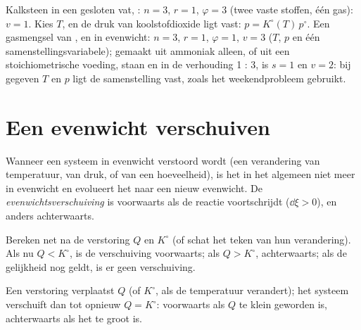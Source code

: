 \begin{example}\label{ex:b2:equilibrium-shifts:variances}
Kalksteen in een gesloten vat, : $n = 3$, $r =
1$, $\varphi = 3$ (twee vaste stoffen, één gas): $v = 1$. Kies $T$, en de druk
van koolstofdioxide ligt vast: $p = K^\circ(T)\,p^\circ$. Een gasmengsel van
,  en  in evenwicht: $n = 3$, $r = 1$, $\varphi = 1$, $v
= 3$ ($T$, $p$ en één samenstellingsvariabele); gemaakt uit ammoniak alleen, of uit
een stoichiometrische voeding, staan  en  in de verhouding 1 : 3, is $s = 1$ en
$v = 2$: bij gegeven $T$ en $p$ ligt de samenstelling vast, zoals het weekendprobleem
gebruikt.
\end{example}

\section{Een evenwicht verschuiven}

\begin{definition}\label{def:b2:equilibrium-shifts:shift}
Wanneer een systeem in evenwicht verstoord wordt (een verandering van temperatuur, van
druk, of van een hoeveelheid), is het in het algemeen niet meer in evenwicht en
evolueert het naar een nieuw evenwicht. De \emph{evenwichtsverschuiving}
is voorwaarts als de reactie voortschrijdt ($\dd\xi > 0$), en anders
achterwaarts.
\end{definition}

\begin{method}\label{met:b2:equilibrium-shifts:predict-shift}
Bereken net na de verstoring $Q$ en $K^\circ$ (of schat het teken van hun verandering).
Als nu $Q < K^\circ$, is de verschuiving voorwaarts; als $Q > K^\circ$,
achterwaarts; als de gelijkheid nog geldt, is er geen verschuiving.
\end{method}

\begin{omfigure}

{\small Een verstoring verplaatst $Q$ (of $K^\circ$, als de temperatuur verandert);
het systeem verschuift dan tot opnieuw $Q = K^\circ$: voorwaarts als $Q$
te klein geworden is, achterwaarts als het te groot is.}
\end{omfigure}

